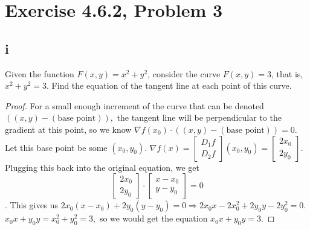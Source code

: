\documentclass{article}
\begin{document}
\section*{Exercise 4.6.2, Problem 3}
\subsection*{i}
Given the function $F(x, y) = x^2 + y^2$, consider the curve $F (x, y) = 3$, that is, $x^2 + y^2 = 3$. Find the equation of the tangent line at each point of this curve.
\begin{proof}
    For a small enough increment of the curve that can be denoted $((x,y)-(\text{base point})),$ the tangent line will be perpendicular to the gradient at this point, so we know $\nabla f(x_0)\cdot ((x,y)-(\text{base point})) = 0$. Let this base point be some $(x_0,y_0)$. $\nabla f(x)= \begin{bmatrix}
        D_1f \\ 
        D_2f
    \end{bmatrix}(x_0,y_0)= \begin{bmatrix}
        2x_0 \\
        2y_0
    \end{bmatrix}$. Plugging this back into the original equation, we get 
    $$\begin{bmatrix}
        2x_0 \\ 2y_0
    \end{bmatrix} \cdot \begin{bmatrix}
        x-x_0 \\ y-y_0 
    \end{bmatrix} = 0$$. This gives us $2x_0(x-x_0)+2y_0(y-y_0)=0 \Rightarrow 2x_0x-2x_0^2+2y_0y-2y_0^2=0$. $x_0x+y_0y=x_0^2+y_0^2=3, $ so we would get the equation $x_0x+y_0y=3$.
\end{proof}
\end{document}
